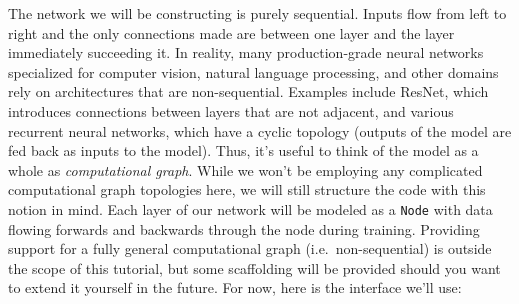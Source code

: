 \documentclass[
]{article}
\begin{document}
The network we will be constructing is purely sequential. Inputs flow
from left to right and the only connections made are between one layer
and the layer immediately succeeding it. In reality, many
production-grade neural networks specialized for computer vision,
natural language processing, and other domains rely on architectures
that are non-sequential. Examples include ResNet, which introduces
connections between layers that are not adjacent, and various recurrent
neural networks, which have a cyclic topology (outputs of the model are
fed back as inputs to the model). Thus, it's useful to think of the
model as a whole as \emph{computational graph}. While we won't be
employing any complicated computational graph topologies here, we will
still structure the code with this notion in mind. Each layer of our
network will be modeled as a \texttt{Node} with data flowing forwards
and backwards through the node during training. Providing support for a
fully general computational graph (i.e.~non-sequential) is outside the
scope of this tutorial, but some scaffolding will be provided should you
want to extend it yourself in the future. For now, here is the interface
we'll use:
\end{document}
